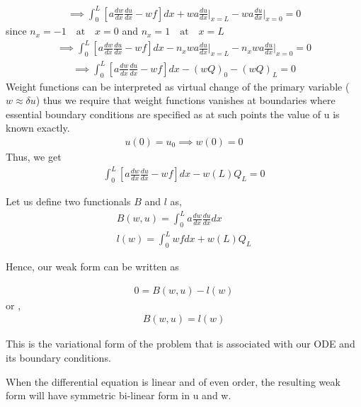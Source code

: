 \begin{itemize}
	\begin{eqnarray}
	\implies	\int_{0}^{L} \left[ a \frac{dw}{dx} \frac{du}{dx} - wf \right] dx  + wa\frac{du}{dx}\biggr|_{x=L} - wa\frac{du}{dx}\biggr|_{x=0} = 0
	\end{eqnarray}
	since $n_x = -1 \quad \text{at} \quad x = 0 $ and $n_x = 1 \quad \text{at} \quad x = L$
	\begin{eqnarray}
	\implies	\int_{0}^{L} \left[ a \frac{dw}{dx} \frac{du}{dx} - wf \right] dx  - n_xwa\frac{du}{dx}\biggr|_{x=L} - n_xwa\frac{du}{dx}\biggr|_{x=0} = 0
	\end{eqnarray}
	\begin{eqnarray}\label{expandedweak}
	\implies \int_{0}^{L} \left[ a \frac{dw}{dx} \frac{du}{dx} - wf \right] dx  -(wQ)_0  -(wQ)_L = 0
	\end{eqnarray}
	Weight functions can be interpreted as virtual change of the primary variable ($ w \approx \delta u $)
	thus we require that weight functions vanishes at boundaries where essential boundary conditions are specified as at such points the value of u is known exactly.
	\begin{eqnarray}
		u(0) = u_0 \implies w(0) = 0
	\end{eqnarray}
Thus, we get
	\begin{eqnarray}
		\int_{0}^{L} \left[ a \frac{dw}{dx} \frac{du}{dx} - wf \right] dx   -w(L)Q_L = 0
	\end{eqnarray}

	
\end{itemize}
Let us define two functionals $B$ and $l$ as,
\begin{eqnarray}
	B(w,u) = \int_{0}^{L} a \frac{dw}{dx} \frac{du}{dx} dx \\
	l(w) = \int_{0}^{L} wf dx + w(L) Q_L
\end{eqnarray}

Hence, our weak form can be written as

\begin{eqnarray}
	0 = B(w,u) - l(w)
\end{eqnarray}
or ,
\begin{eqnarray}\label{variational}
	B(w,u) = l(w)
\end{eqnarray}

This is the variational form of the problem that is associated with our ODE and its boundary conditions.

When the differential equation is linear and of even order, the resulting weak form will have symmetric bi-linear form in u and w.

